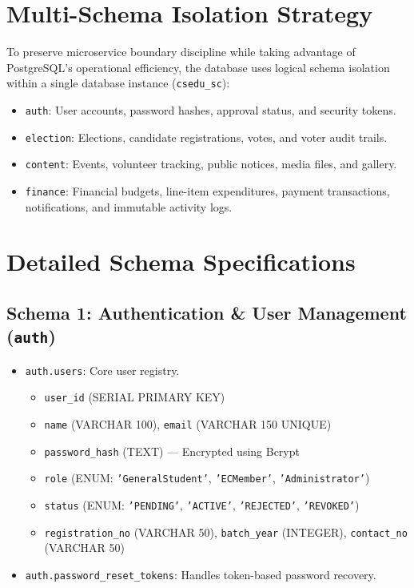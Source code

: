 \documentclass[12pt, a4paper]{report}
\begin{document}
\section{Multi-Schema Isolation Strategy}
To preserve microservice boundary discipline while taking advantage of PostgreSQL's operational efficiency, the database uses logical schema isolation within a single database instance (\texttt{csedu\_sc}):
\begin{itemize}
    \item \texttt{auth}: User accounts, password hashes, approval status, and security tokens.
    \item \texttt{election}: Elections, candidate registrations, votes, and voter audit trails.
    \item \texttt{content}: Events, volunteer tracking, public notices, media files, and gallery.
    \item \texttt{finance}: Financial budgets, line-item expenditures, payment transactions, notifications, and immutable activity logs.
\end{itemize}

\section{Detailed Schema Specifications}

\subsection{Schema 1: Authentication \& User Management (\texttt{auth})}
\begin{itemize}
    \item \texttt{auth.users}: Core user registry.
    \begin{itemize}
        \item \texttt{user\_id} (SERIAL PRIMARY KEY)
        \item \texttt{name} (VARCHAR 100), \texttt{email} (VARCHAR 150 UNIQUE)
        \item \texttt{password\_hash} (TEXT) --- Encrypted using Bcrypt
        \item \texttt{role} (ENUM: \texttt{'GeneralStudent'}, \texttt{'ECMember'}, \texttt{'Administrator'})
        \item \texttt{status} (ENUM: \texttt{'PENDING'}, \texttt{'ACTIVE'}, \texttt{'REJECTED'}, \texttt{'REVOKED'})
        \item \texttt{registration\_no} (VARCHAR 50), \texttt{batch\_year} (INTEGER), \texttt{contact\_no} (VARCHAR 50)
    \end{itemize}
    \item \texttt{auth.password\_reset\_tokens}: Handles token-based password recovery.
\end{itemize}
\end{document}
